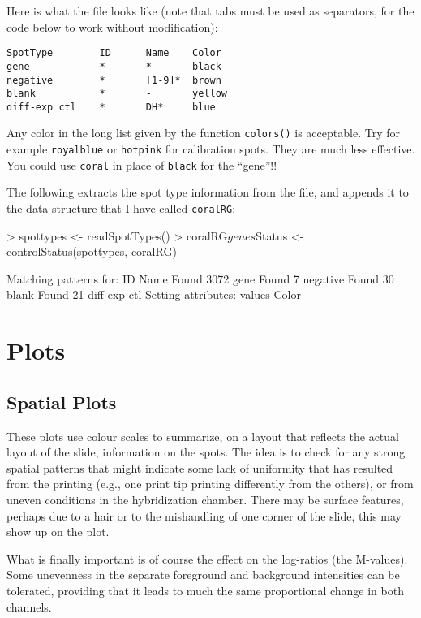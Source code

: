 \documentclass[a4paper,9pt]{article}
\begin{document}
Here is what the file looks like (note that tabs must be 
used as separators, for the code below to work without modification):
\begin{verbatim}
SpotType        ID      Name    Color
gene            *       *       black
negative        *       [1-9]*  brown
blank           *       -       yellow
diff-exp ctl    *       DH*     blue
\end{verbatim}
{\noindent \small Any color in the long list given by the function
\texttt{colors()} is acceptable.  Try for example \texttt{royalblue}
or \texttt{hotpink} for calibration spots.  They are much less
effective.  You could use \texttt{coral} in place of \texttt{black}
for the ``gene''!!}

The following extracts the spot type information from the file,
and appends it to the data structure that I have called 
\texttt{coralRG}:
\begin{Schunk}
\begin{Sinput}
> spottypes <- readSpotTypes()
> coralRG$genes$Status <- controlStatus(spottypes, coralRG)
\end{Sinput}
\begin{Soutput}
Matching patterns for: ID Name 
Found 3072 gene 
Found 7 negative 
Found 30 blank 
Found 21 diff-exp ctl 
Setting attributes: values Color 
\end{Soutput}
\end{Schunk}

\section{Plots}

\subsection{Spatial Plots}
These plots use colour scales to summarize, on a layout that reflects
the actual layout of the slide, information on the spots.  The idea is
to check for any strong spatial patterns that might indicate some lack
of uniformity that has resulted from the printing (e.g., one print tip
printing differently from the others), or from uneven conditions in
the hybridization chamber.  There may be surface features, perhaps due
to a hair or to the mishandling of one corner of the slide, this may
show up on the plot.

What is finally important is of course the effect on the log-ratios
(the M-values).  Some unevenness in the separate foreground and
background intensities can be tolerated, providing that it leads to
much the same proportional change in both channels.
\end{document}
